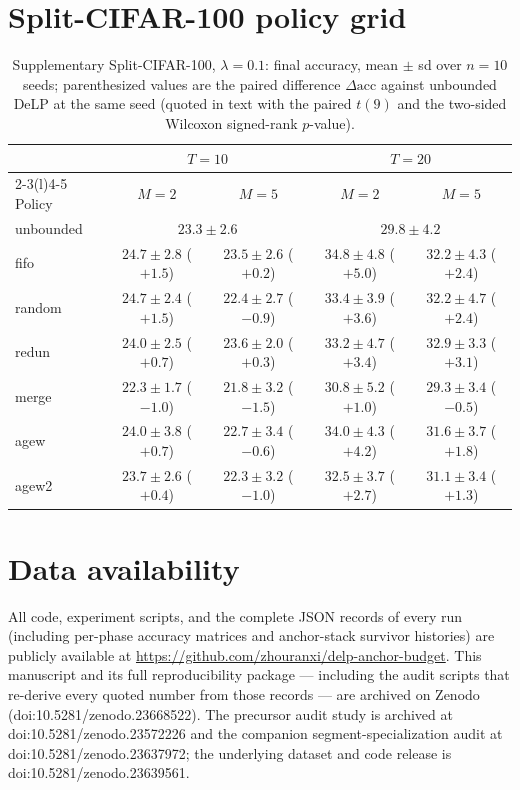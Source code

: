 \documentclass[11pt]{article}
\newcommand{\delp}{DeLP}
\newcommand{\acc}{\mathrm{acc}}
\begin{document}
\section{Split-CIFAR-100 policy grid}
\label{appx:cifar}

\begin{table}[htbp]
\centering\small
\caption{Supplementary Split-CIFAR-100, $\lambda{=}0.1$: final accuracy, mean
$\pm$ sd over $n{=}10$ seeds; parenthesized values are the paired
difference $\Delta\acc$ against unbounded \delp{} at the same seed
(quoted in text with the paired $t(9)$ and the two-sided Wilcoxon
signed-rank $p$-value).}
\label{tab:supp-cifar}
\setlength{\tabcolsep}{4pt}
\footnotesize
\begin{tabular}{lcccc}
\toprule
& \multicolumn{2}{c}{$T{=}10$} & \multicolumn{2}{c}{$T{=}20$} \\
\cmidrule(r){2-3}\cmidrule(l){4-5}
Policy & $M{=}2$ & $M{=}5$ & $M{=}2$ & $M{=}5$ \\
\midrule
unbounded & \multicolumn{2}{c}{$23.3\pm2.6$} & \multicolumn{2}{c}{$29.8\pm4.2$} \\
fifo   & $24.7\pm2.8$ ($+1.5$) & $23.5\pm2.6$ ($+0.2$) &
         $\mathbf{34.8\pm4.8}$ ($+5.0$) & $32.2\pm4.3$ ($+2.4$) \\
random & $24.7\pm2.4$ ($+1.5$) & $22.4\pm2.7$ ($-0.9$) &
         $33.4\pm3.9$ ($+3.6$) & $32.2\pm4.7$ ($+2.4$) \\
redun  & $24.0\pm2.5$ ($+0.7$) & $23.6\pm2.0$ ($+0.3$) &
         $33.2\pm4.7$ ($+3.4$) & $32.9\pm3.3$ ($+3.1$) \\
merge  & $22.3\pm1.7$ ($-1.0$) & $21.8\pm3.2$ ($-1.5$) &
         $30.8\pm5.2$ ($+1.0$) & $29.3\pm3.4$ ($-0.5$) \\
agew   & $24.0\pm3.8$ ($+0.7$) & $22.7\pm3.4$ ($-0.6$) &
         $34.0\pm4.3$ ($+4.2$) & $31.6\pm3.7$ ($+1.8$) \\
agew2  & $23.7\pm2.6$ ($+0.4$) & $22.3\pm3.2$ ($-1.0$) &
         $32.5\pm3.7$ ($+2.7$) & $31.1\pm3.4$ ($+1.3$) \\
\bottomrule
\end{tabular}
\end{table}

\section*{Data availability}
All code, experiment scripts, and the complete JSON records of every
run (including per-phase accuracy matrices and anchor-stack survivor
histories) are publicly available at
\url{https://github.com/zhouranxi/delp-anchor-budget}. This manuscript
and its full reproducibility package --- including the audit scripts
that re-derive every quoted number from those records --- are archived
on Zenodo (doi:10.5281/zenodo.23668522). The precursor audit study is
archived at doi:10.5281/zenodo.23572226 and the companion
segment-specialization audit at doi:10.5281/zenodo.23637972; the
underlying dataset and code release is
doi:10.5281/zenodo.23639561.



\end{document}

